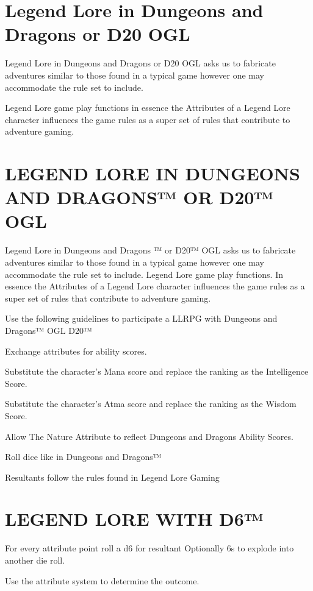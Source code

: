 \documentclass{article}
\begin{document}
 \section{Legend Lore in Dungeons and Dragons or D20 OGL}

Legend Lore in Dungeons and Dragons or D20 OGL asks us to fabricate adventures similar to those found in a typical game however one may accommodate the rule set to include. 

Legend Lore game play functions in essence the Attributes of a Legend Lore character influences the game rules as a super set of rules that contribute to adventure gaming.



\section{LEGEND LORE IN DUNGEONS AND DRAGONS™ OR D20™ OGL}

	Legend Lore in Dungeons and Dragons ™ or D20™ OGL asks us to fabricate adventures similar
to those found in a typical game however one may accommodate the rule set to include. Legend
Lore game play functions. In essence the Attributes of a Legend Lore character influences the
game rules as a super set of rules that contribute to adventure gaming.

	Use the following guidelines to participate a LLRPG with Dungeons and Dragons™ OGL
D20™

Exchange attributes for ability scores.

Substitute the character’s Mana score and replace the ranking as the Intelligence Score.

Substitute the character’s Atma score and replace the ranking as the Wisdom Score.

Allow The Nature Attribute to reflect Dungeons and Dragons Ability Scores.

Roll dice like in Dungeons and Dragons™

Resultants follow the rules found in Legend Lore Gaming

\section{LEGEND LORE WITH D6™}

For every attribute point roll a d6 for resultant  Optionally 6s to explode into another die
roll.

Use the attribute system to determine the outcome.
\end{document}

